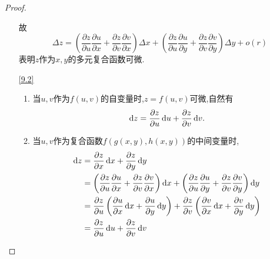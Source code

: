 \begin{proof}
\begin{enumerate}
            故$$\Delta z
            =\left(\frac{\partial z}{\partial u}\frac{\partial u}{\partial x}+\frac{\partial z}{\partial v}\frac{\partial v}{\partial x}\right)\Delta x
            +\left(\frac{\partial z}{\partial u}\frac{\partial u}{\partial y}+\frac{\partial z}{\partial v}\frac{\partial v}{\partial y}\right)\Delta y + o(r)$$
            表明$z$作为$x,y$的多元复合函数可微.
        \item[\ref{9.2}]
        \begin{enumerate}
            \item 当$u,v$作为$f(u,v)$的自变量时,$z=f(u,v)$可微,自然有$$\operatorname{d\!}{}z=\frac{\partial z}{\partial u}\operatorname{d\!}{}u+\frac{\partial z}{\partial v}\operatorname{d\!}{}v.$$
            \item 当$u,v$作为复合函数$f(g(x,y),h(x,y))$的中间变量时,
            \begin{align*}
                \dif{}z
                &=\frac{\partial z}{\partial x}\dif{}x+\frac{\partial z}{\partial y}\dif{}y\\
                &=\left(\frac{\partial z}{\partial u}\frac{\partial u}{\partial x}+\frac{\partial z}{\partial v}\frac{\partial v}{\partial x}\right)\dif{}x
                +\left(\frac{\partial z}{\partial u}\frac{\partial u}{\partial y}+\frac{\partial z}{\partial v}\frac{\partial v}{\partial y}\right)\dif{}y\\
                &=\frac{\partial z}{\partial u} \left(\frac{\partial u}{\partial x}\dif{}x+\frac{\partial u}{\partial y}\dif{}y\right) 
                + \frac{\partial z}{\partial v} \left(\frac{\partial v}{\partial x}\dif{}x+\frac{\partial v}{\partial y}\dif{}y\right)\\
                &=\frac{\partial z}{\partial u}\dif{}u+\frac{\partial z}{\partial v}\dif{}v
            \end{align*}
        \end{enumerate}
    \end{enumerate}
\end{proof}

